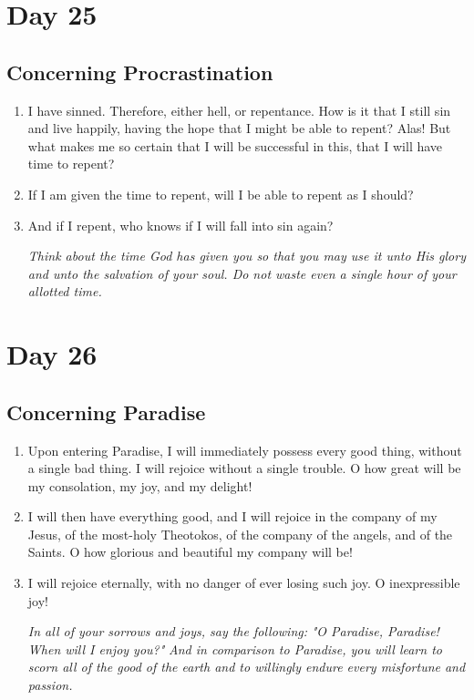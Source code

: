 \documentclass[11pt]{article}
\begin{document}
\section*{Day 25}
\label{sec:orgab5338c}
\subsection*{Concerning Procrastination}
\label{sec:org2a4b036}
\begin{enumerate}
\item I have sinned. Therefore, either hell, or repentance. How is it that I still sin and live happily, having the hope that I might be able to repent? Alas! But what makes me so certain that I will be successful in this, that I will have time to repent?
\item If I am given the time to repent, will I be able to repent as I should?
\item And if I repent, who knows if I will fall into sin again?

\emph{Think about the time God has given you so that you may use it unto His glory and unto the salvation of your soul. Do not waste even a single hour of your allotted time.}
\end{enumerate}
\section*{Day 26}
\label{sec:orgacf9f70}
\subsection*{Concerning Paradise}
\label{sec:orgf9a698c}
\begin{enumerate}
\item Upon entering Paradise, I will immediately possess every good thing, without a single bad thing. I will rejoice without a single trouble. O how great will be my consolation, my joy, and my delight!
\item I will then have everything good, and I will rejoice in the company of my Jesus, of the most-holy Theotokos, of the company of the angels, and of the Saints. O how glorious and beautiful my company will be!
\item I will rejoice eternally, with no danger of ever losing such joy. O inexpressible joy!

\emph{In all of your sorrows and joys, say the following:}
	   \emph{"O Paradise, Paradise! When will I enjoy you?"}
\emph{And in comparison to Paradise, you will learn to scorn all of the good of the earth and to willingly endure every misfortune and passion.}
\end{enumerate}
\end{document}
